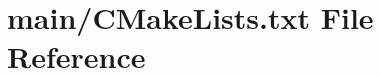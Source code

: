 \hypertarget{CMakeLists_8txt}{}\section{main/\+C\+Make\+Lists.txt File Reference}
\label{CMakeLists_8txt}
